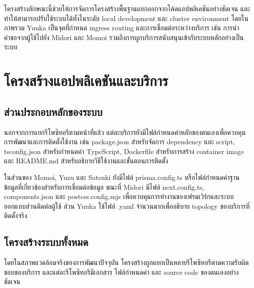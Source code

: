 \hspace*{1.3em}
โครงสร้างลักษณะนี้ช่วยให้การจัดการโครงสร้างพื้นฐานแยกออกจากโค้ดแอปพลิเคชันอย่างชัดเจน และทำให้สามารถปรับใช้ระบบได้ทั้งในระดับ local development และ cluster environment โดยในภาพรวม Yuuka เป็นจุดที่กำหนด ingress routing และการเชื่อมต่อระหว่างบริการ เช่น การนำคำขอจากผู้ใช้ไปยัง Midori และ Momoi รวมถึงการผูกบริการสนับสนุนเข้ากับระบบหลักอย่างเป็นระบบ

\section{โครงสร้างแอปพลิเคชันและบริการ}
\subsection{ส่วนประกอบหลักของระบบ}
\hspace*{1.3em}
นอกจากการแยกรีโพซิทอรีตามหน้าที่แล้ว แต่ละบริการยังมีไฟล์กำหนดค่าหลักของตนเองเพื่อควบคุมการพัฒนาและการติดตั้งใช้งาน เช่น package.json สำหรับจัดการ dependency และ script, tsconfig.json สำหรับกำหนดค่า TypeScript, Dockerfile สำหรับการสร้าง container image และ README.md สำหรับอธิบายวิธีใช้งานและขั้นตอนการติดตั้ง

\hspace*{1.3em}
ในส่วนของ Momoi, Yuzu และ Satsuki ยังมีไฟล์ prisma.config.ts หรือไฟล์กำหนดค่าฐานข้อมูลที่เกี่ยวข้องสำหรับการเชื่อมต่อข้อมูล ขณะที่ Midori มีไฟล์ next.config.ts, components.json และ postcss.config.mjs เพื่อควบคุมการทำงานของเฟรมเวิร์กและระบบออกแบบส่วนติดต่อผู้ใช้ ส่วน Yuuka ใช้ไฟล์ .yaml จำนวนมากเพื่ออธิบาย topology ของบริการที่ติดตั้งจริง

\subsection{โครงสร้างระบบทั้งหมด}
\hspace*{1.3em}
โดยในสภาพแวดล้อมจริงของการพัฒนาปัจจุบัน โครงสร้างถูกแยกเป็นหลายรีโพซิทอรีตามความรับผิดชอบของบริการ และแต่ละรีโพซิทอรีมีเอกสาร ไฟล์กำหนดค่า และ source code ของตนเองอย่างชัดเจน

